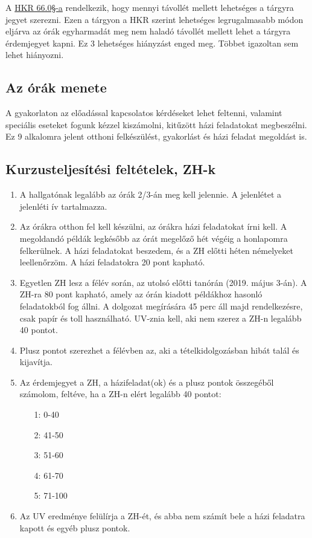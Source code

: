 \documentclass[12pt,a4paper]{scrartcl}
\begin{document}
A \href{https://www.elte.hu/file/ELTE_SZMSZ_II.pdf#page=59}{HKR 66.0§-a} rendelkezik, hogy mennyi távollét mellett lehetséges a tárgyra jegyet szerezni. Ezen a tárgyon a HKR szerint lehetséges legrugalmasabb módon eljárva az órák egyharmadát meg nem haladó távollét mellett lehet a tárgyra érdemjegyet kapni. Ez 3 lehetséges hiányzást enged meg. Többet igazoltan sem lehet hiányozni.

\subsection{Az órák menete}
A gyakorlaton az előadással kapcsolatos kérdéseket lehet feltenni, valamint speciális eseteket fogunk kézzel kiszámolni, kitűzött házi feladatokat megbeszélni. Ez 9 alkalomra jelent otthoni felkészülést, gyakorlást és házi feladat megoldást is.

\iffalse %
\subsection{Kurzusteljesítési feltételek, ZH-k} %
\begin{enumerate}
\item A hallgatónak legalább az órák 2/3-án meg kell jelennie. A jelenlétet a jelenléti ív tartalmazza.
\item Az órákra otthon fel kell készülni, az órákra házi feladatokat írni kell. A megoldandó példák legkésőbb az órát megelőző hét végéig a honlapomra felkerülnek. A házi feladatokat beszedem, és a ZH előtti héten némelyeket leellenőrzöm. A házi feladatokra 20 pont kapható.
\item Egyetlen ZH lesz a félév során, az utolsó előtti tanórán (2019. május 3-án). A ZH-ra 80 pont kapható, amely az órán kiadott példákhoz hasonló feladatokból fog állni. A dolgozat megírására 45 perc áll majd rendelkezésre, csak papír és toll használható. UV-znia kell, aki nem szerez a ZH-n legalább 40 pontot.
\item Plusz pontot szerezhet a félévben az, aki a tételkidolgozásban hibát talál és kijavítja.
\item Az érdemjegyet a ZH, a házifeladat(ok) és a plusz pontok összegéből számolom, feltéve, ha a ZH-n elért legalább 40 pontot:
\begin{itemize}
\item[1:] 0-40
\item[2:] 41-50
\item[3:] 51-60
\item[4:] 61-70
\item[5:] 71-100
\end{itemize}

\item Az UV eredménye felülírja a ZH-ét, és abba nem számít bele a házi feladatra kapott és egyéb plusz pontok.
\end{enumerate}
\end{document}
